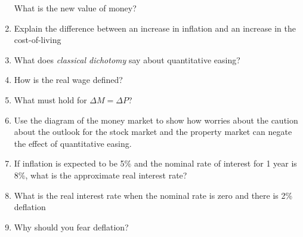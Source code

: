 \documentclass{article}
\begin{document}
\begin{enumerate}
What is the new value of money?

\item Explain the difference between an increase in inflation and an increase in the cost-of-living

\item What does \emph{classical dichotomy} say about quantitative easing? 

\item How is the real wage defined? 

\item What must hold for $\Delta M = \Delta P$?

\item Use the diagram of the money market to show how worries about the caution about the outlook for the stock market and the property market can negate the effect of quantitative easing. 

\item If inflation is expected to be 5\% and the nominal rate of interest for 1 year is 8\%, what is the approximate real interest rate? 

\item What is the real interest rate when the nominal rate is zero and there is 2\% deflation

\item Why should you fear deflation? 

\end{enumerate}
\end{document}
